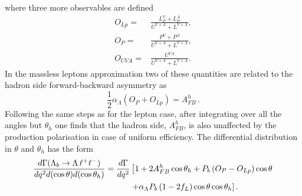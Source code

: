 where three more observables are defined
\begin{align}
O_{Lp}=&\frac{L_P^{V}+L_P^{A}}{U^{V+A}+L^{V+A}}, \nonumber \\
O_P=&\frac{P^{V}+P^{A}}{U^{V+A}+L^{V+A}}, \nonumber \\
O_{UVA}=&\frac{U^{VA}}{U^{V+A}+L^{V+A}}. \nonumber
\end{align}
%
In the massless leptons approximation two of these quantities are related to the hadron side
forward-backward asymmetry as
\begin{equation}
\frac{1}{2}\alpha_\Lambda \left(O_P+O_{Lp}\right)=A_{FB}^h\,.
\end{equation}
%
Following the same steps as for the lepton case, after integrating over all the angles but $\theta_h$ one finds
that the hadron side, $A_{FB}^h$, is also unaffected by the production polarisation in case of uniform
efficiency. The differential distribution in $\theta$ and $\theta_h$ has the form
\begin{align}
\frac{d\Gamma(\Lambda_{b}\rightarrow \Lambda \,\ell^{+}\ell^{-})}{dq^2d(\cos\theta) d(\cos\theta_h)}=
\frac{d\Gamma}{dq^2}&\left[1+2A_{FB}^h\cos\theta_h+P_b\left(O_P-O_{Lp}\right)\cos\theta\right.\nonumber \\
&\left.+\alpha_\Lambda P_b\left(1-2f_L\right)\cos\theta\cos\theta_h\right].
\label{eq:hadron2D}
\end{align}

